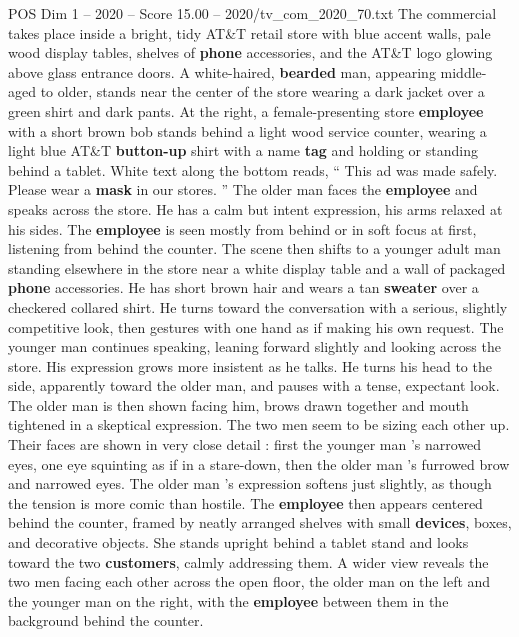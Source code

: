 \begin{textsample}{POS Dim 1 – 2020 – Score 15.00 – 2020/tv\_com\_2020\_70.txt}  \label{ex:f1_pos_015}
The commercial takes place inside a bright, tidy AT\&T retail store with blue accent walls, pale wood display tables, shelves of \textbf{phone} accessories, and the AT\&T logo glowing above glass entrance doors.
A white-haired, \textbf{bearded} man, appearing middle-aged to older, stands near the center of the store wearing a dark jacket over a green shirt and dark pants.
At the right, a female-presenting store \textbf{employee} with a short brown bob stands behind a light wood service counter, wearing a light blue AT\&T \textbf{button-up} shirt with a name \textbf{tag} and holding or standing behind a tablet.
White text along the bottom reads, “ This ad was made safely.
Please wear a \textbf{mask} in our stores. ” The older man faces the \textbf{employee} and speaks across the store.
He has a calm but intent expression, his arms relaxed at his sides.
The \textbf{employee} is seen mostly from behind or in soft focus at first, listening from behind the counter.
The scene then shifts to a younger adult man standing elsewhere in the store near a white display table and a wall of packaged \textbf{phone} accessories.
He has short brown hair and wears a tan \textbf{sweater} over a checkered collared shirt.
He turns toward the conversation with a serious, slightly competitive look, then gestures with one hand as if making his own request.
The younger man continues speaking, leaning forward slightly and looking across the store.
His expression grows more insistent as he talks.
He turns his head to the side, apparently toward the older man, and pauses with a tense, expectant look.
The older man is then shown facing him, brows drawn together and mouth tightened in a skeptical expression.
The two men seem to be sizing each other up.
Their faces are shown in very close detail : first the younger man ’s narrowed eyes, one eye squinting as if in a stare-down, then the older man ’s furrowed brow and narrowed eyes.
The older man ’s expression softens just slightly, as though the tension is more comic than hostile.
The \textbf{employee} then appears centered behind the counter, framed by neatly arranged shelves with small \textbf{devices}, boxes, and decorative objects.
She stands upright behind a tablet stand and looks toward the two \textbf{customers}, calmly addressing them.
A wider view reveals the two men facing each other across the open floor, the older man on the left and the younger man on the right, with the \textbf{employee} between them in the background behind the counter.

\end{textsample}
